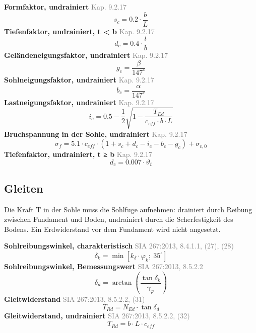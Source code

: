 \documentclass[11pt,a4paper]{article}
\newcommand{\normref}[1]{{\small\textcolor{gray}{#1}}}
\begin{document}
\noindent\textbf{Formfaktor, undrainiert} \hfill \normref{Kap. 9.2.17}
\begin{equation*}
s_c = 0.2 \cdot \frac{b}{L}
\end{equation*}
\noindent\textbf{Tiefenfaktor, undrainiert, t < b} \hfill \normref{Kap. 9.2.17}
\begin{equation*}
d_c = 0.4 \cdot \frac{t}{b}
\end{equation*}
\noindent\textbf{Geländeneigungsfaktor, undrainiert} \hfill \normref{Kap. 9.2.17}
\begin{equation*}
g_c = \frac{\beta}{147^\circ}
\end{equation*}
\noindent\textbf{Sohlneigungsfaktor, undrainiert} \hfill \normref{Kap. 9.2.17}
\begin{equation*}
b_c = \frac{\alpha}{147^\circ}
\end{equation*}
\noindent\textbf{Lastneigungsfaktor, undrainiert} \hfill \normref{Kap. 9.2.17}
\begin{equation*}
i_c = 0.5 - \frac{1}{2} \sqrt{1 - \frac{T_{Ed}}{c_{eff} \cdot b \cdot L}}
\end{equation*}
\noindent\textbf{Bruchspannung in der Sohle, undrainiert} \hfill \normref{Kap. 9.2.17}
\begin{equation*}
\sigma_f = 5.1 \cdot c_{eff} \cdot \left(1 + s_c + d_c - i_c - b_c - g_c\right) + \sigma_{v,0}
\end{equation*}
\noindent\textbf{Tiefenfaktor, undrainiert, t ≥ b} \hfill \normref{Kap. 9.2.17}
\begin{equation*}
d_c = 0.007 \cdot \vartheta_t
\end{equation*}
\subsection{Gleiten}
Die Kraft T in der Sohle muss die Sohlfuge aufnehmen: drainiert durch Reibung zwischen Fundament und Boden, undrainiert durch die Scherfestigkeit des Bodens. Ein Erdwiderstand vor dem Fundament wird nicht angesetzt.

\noindent\textbf{Sohlreibungswinkel, charakteristisch} \hfill \normref{SIA 267:2013, 8.4.1.1, (27), (28)}
\begin{equation*}
\delta_k = \min\left[k_{\delta} \cdot \varphi_k;\ 35^\circ\right]
\end{equation*}
\noindent\textbf{Sohlreibungswinkel, Bemessungswert} \hfill \normref{SIA 267:2013, 8.5.2.2}
\begin{equation*}
\delta_d = \arctan\left(\frac{\tan \delta_k}{\gamma_{\varphi}}\right)
\end{equation*}
\noindent\textbf{Gleitwiderstand} \hfill \normref{SIA 267:2013, 8.5.2.2, (31)}
\begin{equation*}
T_{Rd} = N_{Ed} \cdot \tan \delta_d
\end{equation*}
\noindent\textbf{Gleitwiderstand, undrainiert} \hfill \normref{SIA 267:2013, 8.5.2.2, (32)}
\begin{equation*}
T_{Rd} = b \cdot L \cdot c_{eff}
\end{equation*}
\end{document}
